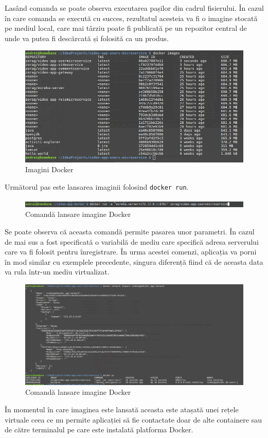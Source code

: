 \documentclass[12pt, a4paper, oneside, romanian]{teza-upb}
\begin{document}
Lasând comanda se poate observa executarea pașilor din cadrul fisierului. În cazul în care comanda se execută cu succes, rezultatul acesteia va fi o imagine stocată pe mediul local, care mai târziu poate fi publicată pe un repozitor central de unde va putea fi descărcată și folosită ca un produs.

  \begin{figure}[ht]
\centering
\includegraphics[scale=0.8]{img/docker-images.png}
\caption{Imagini Docker}
\label{fig:arhi_componente}
\end{figure}
\newpage

Următorul pas este lansarea imaginii folosind \texttt{docker run}.

\begin{figure}[ht]
\centering
\includegraphics[scale=0.5]{img/docker-run-cmd.png}
\caption{Comandă lansare imagine Docker}
\label{fig:arhi_componente}
\end{figure}
Se poate observa că aceasta comandă permite pasarea unor parametri. În cazul de mai sus a fost specificată o variabilă de mediu care specifică adresa serverului care va fi folosit pentru înregistrare. În urma acestei comenzi, aplicația va porni în mod similar cu exemplele precedente, singura diferență fiind că de aceasta data va rula într-un mediu virtualizat.

\begin{figure}[ht]
\centering
\includegraphics[scale=0.5]{img/docker-network.png}
\caption{Comandă lansare imagine Docker}
\label{fig:arhi_componente}
\end{figure}
\newpage
În momentul în care imaginea este lansată aceasta este atașată unei rețele virtuale ceea ce nu permite aplicației să fie contactate doar de alte containere sau de către terminalul pe care este instalată platforma Docker.
\end{document}
